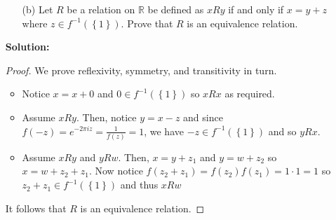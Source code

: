 \documentclass[letterpaper,12pt]{article}
\newcommand{\set}[1]{\left\{ #1 \right\}}
\theoremstyle{definition}
\begin{document}
\begin{enumerate}
    \item[] \begin{enumerate}
        \item[(b)] Let $R$ be a relation on $\mathbb{R}$ be defined as $x R y$ if and only if $x = y + z$ where $z \in f^{-1}(\set{1})$. Prove that $R$ is an equivalence relation.
    \end{enumerate}
     \begin{mdframed}
            \textbf{Solution:}
            \begin{proof} We prove reflexivity, symmetry, and transitivity in turn. \begin{itemize}
                \item Notice $x = x + 0$ and $0 \in f^{-1}(\set{1})$ so $x R x$ as required.
                \item Assume $x R y$. Then, notice $y = x - z$ and since $f(-z) = e^{-2\pi i z} = \frac{1}{f(z)} = 1$, we have $-z \in f^{-1}(\set{1})$ and so $y R x$.
                \item Assume $x R y$ and $y R w$. Then, $x = y + z_1$ and $y = w + z_2$ so $x = w + z_2 + z_1$. Now notice $f(z_2+z_1) = f(z_2)f(z_1) = 1 \cdot 1 = 1$ so $z_2 + z_1 \in f^{-1}(\set{1})$ and thus $x R w$
            \end{itemize}
            It follows that $R$ is an equivalence relation. \end{proof}
        \end{mdframed}
\end{enumerate}
\pagebreak
\end{document}
